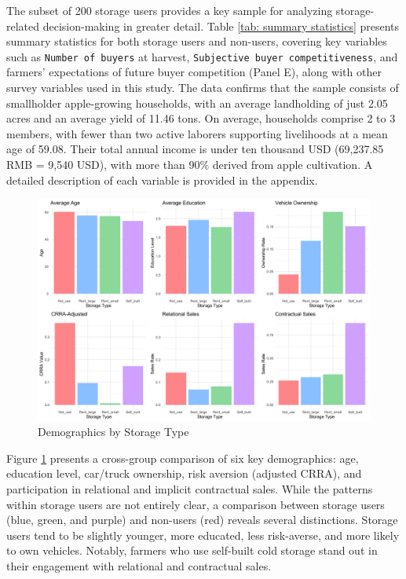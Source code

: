 \documentclass[12pt]{article}
\begin{document}
The subset of 200 storage users provides a key sample for analyzing storage-related decision-making in greater detail. Table \ref{tab: summary statistics} presents summary statistics for both storage users and non-users, covering key variables such as \texttt{Number of buyers} at harvest, \texttt{Subjective buyer competitiveness}, and farmers' expectations of future buyer competition (Panel E), along with other survey variables used in this study. The data confirms that the sample consists of smallholder apple-growing households, with an average landholding of just 2.05 acres and an average yield of 11.46 tons. On average, households comprise 2 to 3 members, with fewer than two active laborers supporting livelihoods at a mean age of 59.08. Their total annual income is under ten thousand USD (69,237.85 RMB = 9,540 USD), with more than 90\% derived from apple cultivation. A detailed description of each variable is provided in the appendix.

\begin{figure}[htp]
\centering
\includegraphics[width=1\textwidth]{figures/combined_storage_metrics.png}
\caption{Demographics by Storage Type}
\label{Figure: Demographics by Storage Type}
\end{figure}

Figure \ref{Figure: Demographics by Storage Type} presents a cross-group comparison of six key demographics: age, education level, car/truck ownership, risk aversion (adjusted CRRA), and participation in relational and implicit contractual sales. While the patterns within storage users are not entirely clear, a comparison between storage users (blue, green, and purple) and non-users (red) reveals several distinctions. Storage users tend to be slightly younger, more educated, less risk-averse, and more likely to own vehicles. Notably, farmers who use self-built cold storage stand out in their engagement with relational and contractual sales.
\end{document}
